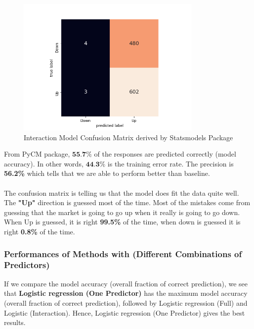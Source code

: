 \documentclass[12pt]{article}
\begin{document}
\begin{figure}[!htbp]
	\centering
	\includegraphics[width=9cm]{intmodel.png}
	\caption{Interaction Model Confusion Matrix derived by Statsmodels Package}
	\label{fig_5}
\end{figure}

From PyCM package, $\textbf{55.7\%}$ of the responses are predicted correctly (model accuracy). In other words, $\textbf{44.3\%}$ is the training error rate. The precision is \textbf{56.2\%} which tells that we are able to perform better than baseline.\\\\
The confusion matrix is telling us that the model does fit the data quite well. The \textbf{"Up"} direction is guessed most of the time. Most of the mistakes come from guessing that the market is going to go up when it really is going to go down. When Up is guessed, it is right \textbf{99.5\%} of the time, when down is guessed it is right \textbf{0.8\%} of the time.

\subsubsection{Performances of Methods with (Different Combinations of Predictors)}

\begin{table}[h!]
	\centering
\caption{Performances of Methods with (Different Combinations of Predictors)}
\end{table}
If we compare the model accuracy (overall fraction of correct prediction), we see that \textbf{Logistic regression (One Predictor)} has the maximum model accuracy (overall fraction of correct prediction), followed by Logistic regression (Full) and Logistic (Interaction). Hence, Logistic regression (One Predictor) gives the best results.
\end{document}
